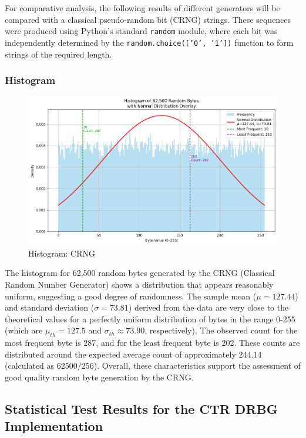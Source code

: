 For comparative analysis, the following results of different generators will be compared with a classical pseudo-random bit (CRNG) strings. These sequences were produced using Python's standard \texttt{random} module, where each bit was independently determined by the \texttt{random.choice(['0', '1'])} function to form strings of the required length.

\subsubsection{\textbf{Histogram}}


\begin{figure}[htbp] 
    \centering 
    \includegraphics[width=0.9\columnwidth]{images/Hist_CRNG.png} 
    \caption{Histogram: CRNG}
    \label{fig:H:CRNG}
\end{figure}

The histogram for 62,500 random bytes generated by the CRNG (Classical Random Number Generator) shows a distribution that appears reasonably uniform, suggesting a good degree of randomness. The sample mean ($\mu = 127.44$) and standard deviation ($\sigma = 73.81$) derived from the data are very close to the theoretical values for a perfectly uniform distribution of bytes in the range 0-255 (which are $\mu_{th} = 127.5$ and $\sigma_{th} \approx 73.90$, respectively). The observed count for the most frequent byte is 287, and for the least frequent byte is 202. These counts are distributed around the expected average count of approximately $244.14$ (calculated as $62500 / 256$). Overall, these characteristics support the assessment of good quality random byte generation by the CRNG.

\subsection{Statistical Test Results for the CTR DRBG Implementation} 

